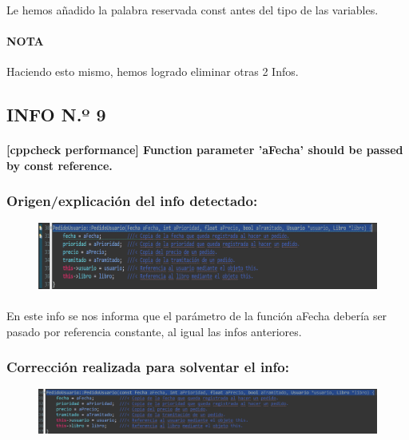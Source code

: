 			\paragraph{}Le hemos añadido la palabra reservada const antes del tipo de las variables.
			
			\paragraph{NOTA}Haciendo esto mismo, hemos logrado eliminar otras 2 Infos.
	\subsection{INFO N.º 9}
	
		\paragraph{[cppcheck performance] Function parameter 'aFecha' should be passed by const reference.}
	
		\subsubsection{Origen/explicación del info detectado:}
		
			\begin{figure}[H]
				\centering
				\includegraphics[scale=0.55]{img/esteban14.png}
				\label{esteban14}
			\end{figure}	
		
			\paragraph{}En este info se nos informa que el parámetro de la función aFecha debería ser pasado por referencia constante, al igual las infos anteriores.
			
		\subsubsection{Corrección realizada para solventar el info:}
		
			\begin{figure}[H]
				\centering
				\includegraphics[scale=0.55]{img/esteban15.png}
				\label{esteban15}
			\end{figure}
		
